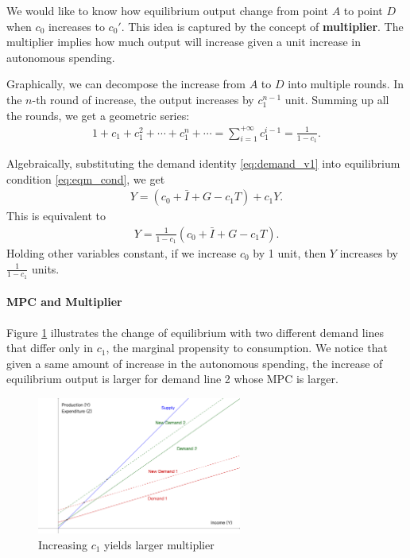 \documentclass[12pt]{article}
\begin{document}
We would like to know how equilibrium output change from point $A$ to point $D$ when $c_0$ increases to $c_0'$. This idea is captured by the concept of \textbf{multiplier}. The multiplier implies how much output will increase given a unit increase in autonomous spending. 

Graphically, we can decompose the increase from $A$ to $D$ into multiple rounds. In the $n$-th round of increase, the output increases by $c_1^{n-1}$ unit. Summing up all the rounds, we get a geometric series:
\begin{align*}
    1 + c_1 + c_1^2 + \cdots + c_1^n + \cdots = \sum_{i=1}^{+\infty} c_1^{i-1} = \frac{1}{1-c_1}.
\end{align*}

Algebraically, substituting the demand identity \eqref{eq:demand_v1} into equilibrium condition \eqref{eq:eqm_cond}, we get
\begin{align*}
    Y = (c_0 + \bar{I} + G - c_1T) + c_1Y.
\end{align*}
This is equivalent to
\begin{align*}
    Y = \frac{1}{1-c_1} (c_0 + \bar{I} + G - c_1T).
\end{align*}
Holding other variables constant, if we increase $c_0$ by 1 unit, then $Y$ increases by $\frac{1}{1-c_1}$ units.

\paragraph{MPC and Multiplier}
Figure \ref{fig:key_cross_v3} illustrates the change of equilibrium with two different demand lines that differ only in $c_1$, the marginal propensity to consumption. We notice that given a same amount of increase in the autonomous spending, the increase of equilibrium output is larger for demand line 2 whose MPC is larger.

\begin{figure}[htp]
    \centering
    \includegraphics[width=0.6\textwidth]{keynesian_cross_c1change.png}
    \caption{Increasing $c_1$ yields larger multiplier}
    \label{fig:key_cross_v3}
\end{figure}
\end{document}
